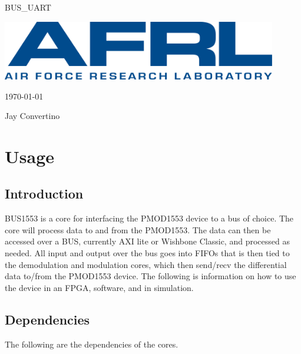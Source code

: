 \begin{titlepage}
  \begin{center}

  {\Huge BUS\_UART}

  \vspace{25mm}

  \includegraphics[width=0.90\textwidth,height=\textheight,keepaspectratio]{img/AFRL.png}

  \vspace{25mm}

  \today

  \vspace{15mm}

  {\Large Jay Convertino}

  \end{center}
\end{titlepage}

\tableofcontents

\newpage

\section{Usage}

\subsection{Introduction}

\par
BUS1553 is a core for interfacing the PMOD1553 device to a bus of choice. The core will process data to and from the PMOD1553.
The data can then be accessed over a BUS, currently AXI lite or Wishbone Classic, and processed as needed. All input and output
over the bus goes into FIFOs that is then tied to the demodulation and modulation cores, which then send/recv the differential data
to/from the PMOD1553 device. The following is information on how to use the device in an FPGA, software, and in simulation.

\subsection{Dependencies}

\par
The following are the dependencies of the cores.

